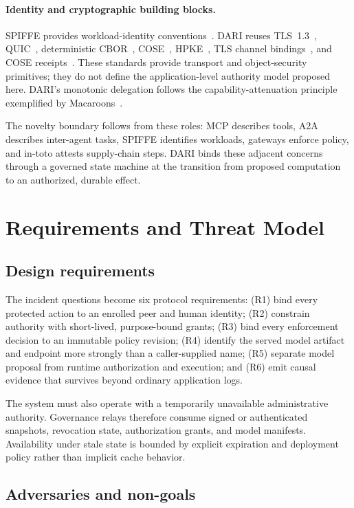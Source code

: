 \documentclass[10pt]{article}
\newcommand{\dariname}{DARI}
\begin{document}
\paragraph{Identity and cryptographic building blocks.}
SPIFFE provides workload-identity conventions~\cite{spiffe}. \dariname{} reuses TLS~1.3~\cite{rfc9846}, QUIC~\cite{rfc9000}, deterministic CBOR~\cite{rfc8949}, COSE~\cite{rfc9052}, HPKE~\cite{rfc9180}, TLS channel bindings~\cite{rfc9266}, and COSE receipts~\cite{rfc9942}. These standards provide transport and object-security primitives; they do not define the application-level authority model proposed here. DARI's monotonic delegation follows the capability-attenuation principle exemplified by Macaroons~\cite{birgisson2014macaroons}.

The novelty boundary follows from these roles: MCP describes tools, A2A describes inter-agent tasks, SPIFFE identifies workloads, gateways enforce policy, and in-toto attests supply-chain steps. DARI binds these adjacent concerns through a governed state machine at the transition from proposed computation to an authorized, durable effect.

\section{Requirements and Threat Model}

\subsection{Design requirements}

The incident questions become six protocol requirements: (R1) bind every protected action to an enrolled peer and human identity; (R2) constrain authority with short-lived, purpose-bound grants; (R3) bind every enforcement decision to an immutable policy revision; (R4) identify the served model artifact and endpoint more strongly than a caller-supplied name; (R5) separate model proposal from runtime authorization and execution; and (R6) emit causal evidence that survives beyond ordinary application logs.

The system must also operate with a temporarily unavailable administrative authority. Governance relays therefore consume signed or authenticated snapshots, revocation state, authorization grants, and model manifests. Availability under stale state is bounded by explicit expiration and deployment policy rather than implicit cache behavior.

\subsection{Adversaries and non-goals}
\end{document}
